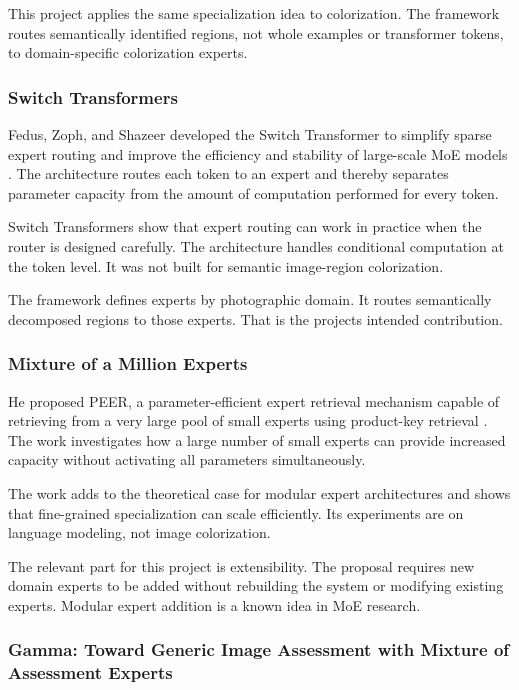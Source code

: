 \documentclass{FastFyp}
\begin{document}
This project applies the same specialization idea to colorization. The framework routes semantically identified regions, not whole examples or transformer tokens, to domain-specific colorization experts.

\subsubsection{Switch Transformers}

Fedus, Zoph, and Shazeer developed the Switch Transformer to simplify sparse expert routing and improve the efficiency and stability of large-scale MoE models \cite{ref13}. The architecture routes each token to an expert and thereby separates parameter capacity from the amount of computation performed for every token.

Switch Transformers show that expert routing can work in practice when the router is designed carefully. The architecture handles conditional computation at the token level. It was not built for semantic image-region colorization.

The framework defines experts by photographic domain. It routes semantically decomposed regions to those experts. That is the project\textquotesingle s intended contribution.

\subsubsection{Mixture of a Million Experts}

He proposed PEER, a parameter-efficient expert retrieval mechanism capable of retrieving from a very large pool of small experts using product-key retrieval \cite{ref14}. The work investigates how a large number of small experts can provide increased capacity without activating all parameters simultaneously.

The work adds to the theoretical case for modular expert architectures and shows that fine-grained specialization can scale efficiently. Its experiments are on language modeling, not image colorization.

The relevant part for this project is extensibility. The proposal requires new domain experts to be added without rebuilding the system or modifying existing experts. Modular expert addition is a known idea in MoE research.

\subsubsection{Gamma: Toward Generic Image Assessment with Mixture of Assessment Experts}
\end{document}
